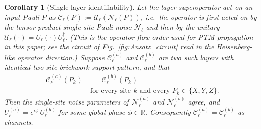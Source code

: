 \documentclass[%
 reprint,
superscriptaddress,
 amsmath,amssymb,
 aps,
]{revtex4-2}
\newtheorem{corollary}{Corollary}[theorem]
\begin{document}
\begin{corollary}[Single-layer identifiability]
\label{cor:single_layer_identifiability}
Let the layer superoperator act on an input Pauli $P$ as $\mathcal{C}_\ell(P):= \mathcal{U}_\ell(\mathcal{N}_\ell(P))$, i.e.\ the operator is first acted on by the tensor-product single-site Pauli noise $\mathcal{N}_\ell$ and then by the unitary $\mathcal{U}_\ell(\cdot) = U_\ell(\cdot)U_\ell^{\dagger}$. (This is the operator-flow order used for PTM propagation in this paper; see the circuit of Fig.~\ref{fig:Ansatz_circuit} read in the Heisenberg-like operator direction.) Suppose $\mathcal{C}_\ell^{(a)}$ and $\mathcal{C}_\ell^{(b)}$ are two such layers with identical two-site brickwork support pattern, and that
\begin{equation}
    \begin{split}
        \mathcal{C}_\ell^{(a)}(P_k) \;&=\; \mathcal{C}_\ell^{(b)}(P_k)\\
        &\text{for every site }k\text{ and every }P_k\in\{X,Y,Z\}.
    \end{split}
\end{equation}
Then the single-site noise parameters of $\mathcal{N}_\ell^{(a)}$ and $\mathcal{N}_\ell^{(b)}$ agree, and $U_\ell^{(a)} = e^{i\phi}\,U_\ell^{(b)}$ for some global phase $\phi\in\mathbb{R}$. Consequently $\mathcal{C}_\ell^{(a)}=\mathcal{C}_\ell^{(b)}$ as channels.
\end{corollary}
\end{document}
